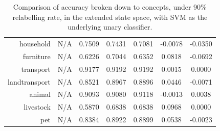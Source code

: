 \documentclass[11pt,a4paper]{article}
\begin{document}
\begin{table}[htbp]
\begin{tabular}{r|c|c|c|c|c|c}
household     & N/A    & 0.7509 & 0.7431 & 0.7081 & -0.0078 & -0.0350\\
furniture     & N/A    & 0.6226 & 0.7044 & 0.6352 & 0.0818 & -0.0692\\
transport     & N/A    & 0.9177 & 0.9192 & 0.9192 & 0.0015 & 0.0000\\
landtransport & N/A    & 0.8521 & 0.8967 & 0.8896 & 0.0446 & -0.0071\\
animal        & N/A    & 0.9093 & 0.9080 & 0.9118 & -0.0013 & 0.0038\\
livestock     & N/A    & 0.5870 & 0.6838 & 0.6838 & 0.0968 & 0.0000\\
pet           & N/A    & 0.8384 & 0.8922 & 0.8899 & 0.0538 & -0.0023
\end{tabular}
\caption{Comparison of accuracy broken down to concepts, under 90\% relabelling rate, in the extended state space, with SVM as the underlying unary classifier.}
\label{tab:svm90acc}
\end{table}
\end{document}
